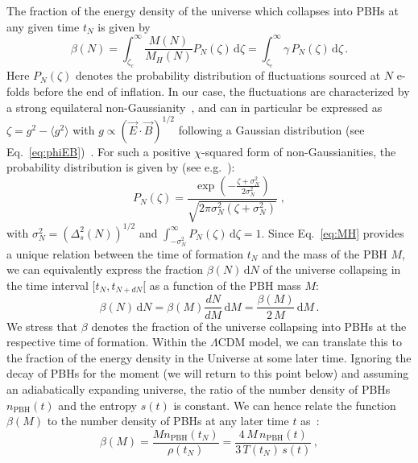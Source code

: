The fraction of the energy density of the universe which collapses into PBHs at any given time $t_N$ is given by 
\begin{equation}
\beta(N) = \int_{\zeta_c}^\infty  \frac{ M(N)}{M_H(N)} P_N(\zeta) \, \textrm{d}\zeta =  \int_{\zeta_c}^\infty  \gamma \, P_N(\zeta) \, \textrm{d}\zeta\,.
\label{eq:beta0}
\end{equation}
Here $P_N(\zeta)$ denotes the probability distribution of fluctuations sourced at $N$ e-folds before the end of inflation. In our case, the fluctuations are characterized by a strong equilateral non-Gaussianity~\cite{Anber:2012du}, and can in particular be expressed as $\zeta = g^2 - \langle g^2 \rangle$ with $g \propto (\vec E \cdot \vec B)^{1/2}$ following a Gaussian distribution (see Eq.~\ref{eq:phiEB})~\cite{Linde:2012bt}. For such a positive $\chi$-squared form of non-Gaussianities, the probability distribution is given by (see e.g.~\cite{0510052, 1201.4312, Byrnes:2012yx}):
\begin{equation}
P_N(\zeta) = \frac{\exp \left( - \frac{\zeta + \sigma_N^2}{2 \sigma_N^2}\right)}{\sqrt{2 \pi \sigma_N^2 (\zeta + \sigma_N^2)}} \;,
\label{eq:Pnongauss}
\end{equation}
with $\sigma_N^2 = (\Delta_s^2(N))^{1/2}$ and $\int_{- \sigma_N^2}^\infty P_N(\zeta) \, \textrm{d}\zeta = 1$.  
Since Eq.~\eqref{eq:MH} provides a unique relation between the time of formation $t_N$ and the mass of the PBH $M$, we can equivalently express the fraction $\beta(N) \, \textrm{d}N$ of the universe collapsing in the time interval $[t_N, t_{N + dN}[$ as a function of the PBH mass $M$:
\begin{equation}
\beta(N) \, \textrm{d}N = \beta(M) \frac{dN}{dM}\, \textrm{d}M = \frac{\beta(M)}{2 \, M} \, \textrm{d}M \,.
\label{eq:betaM}
\end{equation}
We stress that $\beta$ denotes the fraction of the universe collapsing into PBHs at the respective time of formation. Within the $\Lambda$CDM model, we can translate this to the fraction of the energy density in the Universe at some later time. Ignoring the decay of PBHs for the moment (we will return to this point below) and assuming an adiabatically expanding universe, the ratio of the number density of PBHs $n_{\text{PBH}}(t)$ and the entropy $s(t)$ is constant. We can hence relate the function $\beta(M)$ to the number density of PBHs at any later time $t$ as~\cite{Carr:2009jm}:
\begin{equation}
\beta(M) = \frac{M n_\text{PBH}(t_N)}{\rho(t_N)} = \frac{4\,  M \, n_\text{PBH}(t)}{3 \, T(t_N) \, s(t)} \,,
\label{eq:nPBH}
\end{equation}
